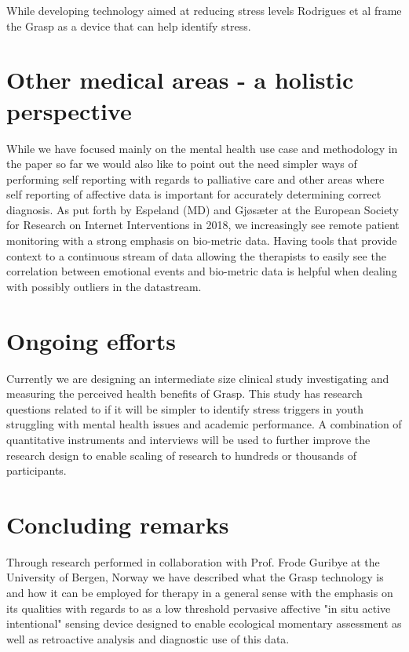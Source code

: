 While developing technology aimed at reducing stress levels Rodrigues et al \cite[p.~1]{Rodrigues:2019:LTS:3341162.3343773} frame the Grasp as a device that can help identify stress.


\section{Other medical areas - a holistic perspective}
While we have focused mainly on the mental health use case and methodology in the paper so far we would also like to point out the need simpler ways of performing self reporting with regards to palliative care and other areas where self reporting of affective data is important for accurately determining correct diagnosis. As put forth by Espeland (MD) and Gjøsæter \cite{gjosater2018esrii} at the European Society for Research on Internet Interventions in 2018, we increasingly see remote patient monitoring with a strong emphasis on bio-metric data. Having tools that provide context to a continuous stream of data allowing the therapists to easily see the correlation between emotional events and bio-metric data is helpful when dealing with possibly outliers in the datastream.


\section{Ongoing efforts}
Currently we are designing an intermediate size clinical study investigating and measuring the perceived health benefits of Grasp. This study has research questions related to if it will be simpler to identify stress triggers in youth struggling with mental health issues and academic performance. A combination of quantitative instruments \cite{hopkinsdoi:10.1002/bs.3830190102} and interviews will be used to further improve the research design to enable scaling of research to hundreds or thousands of participants.

\section{Concluding remarks}
Through research performed in collaboration with Prof. Frode Guribye at the University of Bergen, Norway we have described what the Grasp technology is and how it can be employed for therapy in a general sense with the emphasis on its qualities with regards to as a low threshold pervasive affective "in situ active intentional" \cite[p.~2]{guribye2016}  sensing device designed to enable ecological momentary assessment as well as retroactive analysis and diagnostic use of this data.





\balance{}

